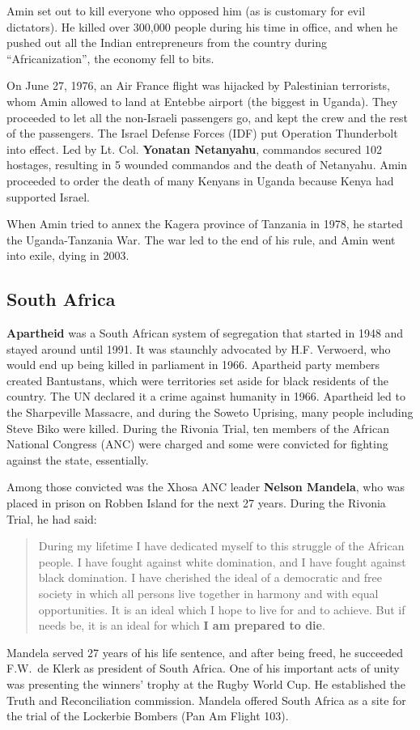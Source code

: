 Amin set out to kill everyone who opposed him (as is customary for evil dictators).
He killed over 300,000 people during his time in office,
and when he pushed out all the Indian entrepreneurs from the country during ``Africanization'',
the economy fell to bits.

On June 27, 1976, an Air France flight was hijacked by Palestinian terrorists,
whom Amin allowed to land at Entebbe airport (the biggest in Uganda).
They proceeded to let all the non-Israeli passengers go, and kept the crew and the rest of the passengers.
The Israel Defense Forces (IDF) put Operation Thunderbolt into effect.
Led by Lt. Col. \textbf{Yonatan Netanyahu}, commandos secured 102 hostages,
resulting in 5 wounded commandos and the death of Netanyahu.
Amin proceeded to order the death of many Kenyans in Uganda because Kenya had supported Israel.

When Amin tried to annex the Kagera province of Tanzania in 1978, he started the Uganda-Tanzania War.
The war led to the end of his rule, and Amin went into exile, dying in 2003.



\subsection*{South Africa}

\textbf{Apartheid} was a South African system of segregation that started in 1948 and stayed around until 1991.
It was staunchly advocated by H.F. Verwoerd, who would end up being killed in parliament in 1966.
Apartheid party members created Bantustans, which were territories set aside for black residents of the country.
The UN declared it a crime against humanity in 1966.
Apartheid led to the Sharpeville Massacre,
and during the Soweto Uprising, many people including Steve Biko were killed.
During the Rivonia Trial, ten members of the African National Congress (ANC) were charged and some were convicted
for fighting against the state, essentially.

Among those convicted was the Xhosa ANC leader \textbf{Nelson Mandela},
who was placed in prison on Robben Island for the next 27 years.
During the Rivonia Trial, he had said:
\begin{quote}
  During my lifetime I have dedicated myself to this struggle of the African people.
  I have fought against white domination, and I have fought against black domination.
  I have cherished the ideal of a democratic and free society in which all persons live together
  in harmony and with equal opportunities.
  It is an ideal which I hope to live for and to achieve.
  But if needs be, it is an ideal for which \textbf{I am prepared to die}.
\end{quote}
Mandela served 27 years of his life sentence, and after being freed,
he succeeded F.W.\ de Klerk as president of South Africa.
One of his important acts of unity was presenting the winners' trophy at the Rugby World Cup.
He established the Truth and Reconciliation commission.
Mandela offered South Africa as a site for the trial of the Lockerbie Bombers (Pan Am Flight 103).
